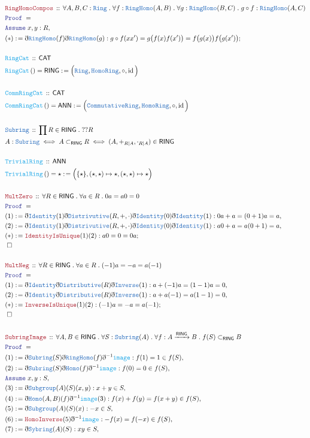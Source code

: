\documentclass[12pt]{scrartcl}
\newcommand{\TYPE}[1]{\textcolor{NavyBlue}{\mathtt{#1}}}
\newcommand{\FUNC}[1]{\textcolor{Cerulean}{\mathtt{#1}}}
\newcommand{\LOGIC}[1]{\textcolor{Blue}{\mathtt{#1}}}
\newcommand{\THM}[1]{\textcolor{Maroon}{\mathtt{#1}}}
\renewcommand{\.}{\; . \;}
\newcommand{\de}{: \kern 0.1pc =}
\newcommand{\Act}[1]{\left( #1 \right)}
\newcommand{\Theorem}[2]{& \THM{#1} \, :: \, #2 \\ & \Proof = \\ }
\newcommand{\DeclareType}[2]{& \TYPE{#1} \, :: \, #2 \\}
\newcommand{\DefineNamedType}[4]{& #1 : \TYPE{#2} \iff #3 \iff #4 \\}
\newcommand{\DeclareFunc}[2]{& \FUNC{#1} \, :: \, #2 \\}
\newcommand{\DefineNamedFunc}[4]{&  \FUNC{#1}\Act{#2} = #3 \de #4 \\}
\newcommand{\Page}[1]{ \begin{align*} #1 \end{align*}   }
\newcommand{ \bd }{ \ByDef }
\DeclareMathOperator*{\id}{id}
\newcommand{\Say}[3]{& #1 \de #2 : #3, \\}
\newcommand{\Conclude}[3]{& #1 \de #2 : #3; \\}
\newcommand{\Assume}[2]{& \LOGIC{Assume} \; #1 : #2, \\}
\newcommand{\QED}{\; \square}
\newcommand{\EndProof}{& \QED \\}
\newcommand{\ByDef}{\eth}
\newcommand{\Proof}{\LOGIC{Proof} \; }
\newcommand{\Arrow}[1]{\xrightarrow{#1}}
\newcommand{\CAT}{\mathsf{CAT}}
\newcommand{\Ring}{\TYPE{Ring}}
\newcommand{\CR}{\TYPE{CommutativeRing}}
\newcommand{\RING}{\mathsf{RING}}
\newcommand{\ANN}{\mathsf{ANN}}
\begin{document}
\Page{
	\Theorem{RingHomoCompos}{\forall A,B,C : \Ring \. \forall f : \TYPE{RingHomo}(A,B) \. \forall g : \TYPE{RingHomo}(B,C) \. 
		g \circ f : \TYPE{RingHomo}(A,C)}
	\Assume{x,y}{R}
	\Conclude{(*)}{\bd \TYPE{RingHomo}(f)\bd \TYPE{RingHomo}(g)}{g \circ f(xx') = g\big( f(x) f(x') \big) = f\big(g(x)\big)f\big(g(x')\big)  }
	\\
	\DeclareFunc{RingCat}{\CAT}
	\DefineNamedFunc{RingCat}{}{\RING}{\Big( \Ring, \TYPE{HomoRing},\circ,\id \Big)}
	\\
	\DeclareFunc{CommRingCat}{\CAT}
	\DefineNamedFunc{CommRingCat}{}{\ANN}{\Big( \CR, \TYPE{HomoRing},\circ,\id \Big)}		
	\\
	\DeclareType{Subring}{\prod R \in \RING \. ??R}
	\DefineNamedType{A}{Subring}{A \subset_{\RING} R}{(A,+_{R|A},\cdot_{R|A}) \in \RING}
	\\
	\DeclareFunc{TrivialRing}{ \ANN  }
	\DefineNamedFunc{TrivialRing}{}{\star}{\Big(\{\star\}, (\star,\star) \mapsto \star, (\star,\star) \mapsto \star \Big)}
	\\
	\Theorem{MultZero}{\forall R \in \RING \. \forall a \in R \. 0a = a0 = 0}
	\Say{(1)}{ \bd \TYPE{Identity}(1)\bd \TYPE{Distrivutive}(R,+,\cdot)\bd\TYPE{Identity}(0)\bd\TYPE{Identity}(1)  }{  0a + a = (0 + 1)a = a   }
	\Say{(2)}{ \bd \TYPE{Identity}(1)\bd \TYPE{Distrivutive}(R,+,\cdot)\bd\TYPE{Identity}(0)\bd\TYPE{Identity}(1)  }{  a0 + a = a(0 + 1) = a  }
	\Conclude{(*)}{\THM{IdentityIsUnique}(1)(2)}{a0 = 0 = 0a}
	\EndProof
	\\
	\Theorem{MultNeg}{\forall R \in \RING \. \forall a \in R \. (-1)a = -a = a(-1)}
	\Say{(1)}{\bd \TYPE{Identity}\bd \TYPE{Distributive}(R)\bd \TYPE{Inverse}(1)}{ a + (-1)a = (1 - 1)a = 0}
	\Say{(2)}{\bd \TYPE{Identity}\bd \TYPE{Distributive}(R)\bd \TYPE{Inverse}(1)}{ a + a(-1) = a(1 - 1) = 0}
	\Conclude{(*)}{\THM{InverseIsUnique}(1)(2)}{ (-1)a = - a = a(-1)}
	\EndProof
	\\
	\Theorem{SubringImage}{\forall A,B \in \RING \. \forall S : \TYPE{Subring}(A) \. \forall f : A \Arrow{\RING} B \. f(S) \subset_{\RING} B}
	\Say{(1)}{\bd \TYPE{Subring}(S)\bd \TYPE{RingHomo}(f)\bd^{-1}\FUNC{image}}{f(1) = 1 \in f(S)}
	\Say{(2)}{\bd \TYPE{Subring}(S) \bd \TYPE{Homo}(f) \bd^{-1} \FUNC{image}}{f(0) = 0 \in f(S)}
	\Assume{x,y}{S}
	\Say{(3)}{\bd \TYPE{Subgroup}(A)(S)(x,y)}{x + y \in S}
	\Say{(4)}{\bd \TYPE{Homo}(A,B)(f)\bd^{-1} \FUNC{image}(3)}{f(x) + f(y) = f(x + y) \in f(S)}
	\Say{(5)}{\bd \TYPE{Subgroup}(A)(S)(x)}{-x \in S}
	\Say{(6)}{\THM{HomoInverse}(5) \bd^{-1} \FUNC{image}}{ -f(x) = f(-x) \in f(S)}
	\Say{(7)}{\bd \TYPE{Sybring}(A)(S)}{xy \in S}
}
\end{document}
